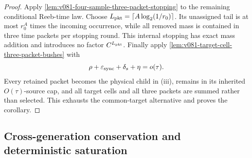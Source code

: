 \documentclass[10pt]{article}
\begin{document}
\begin{proof}
Apply
\cref{lem:v081-four-sample-three-packet-stopping} to the remaining conditional Reeb-time law.
Choose \(L_{\rm pkt}=\lceil A\log_2(1/r_0)\rceil\).  Its unassigned tail is at most
\(r_0^A\) times the incoming occurrence, while all removed mass is contained in three time packets
per stopping round.  This internal stopping has exact mass addition and introduces no factor
\(C^{L_{\rm pkt}}\).  Finally apply
\cref{lem:v081-target-cell-three-packet-bushes} with
\[
\rho+\varepsilon_{\rm sync}+\delta_s+\eta=o(\tau).
\]
Every retained packet becomes the physical child in \textnormal{(iii)}, remains in its inherited
\(O(\tau)\)-source cap, and all target cells and all three packets are summed rather than selected.
This exhausts the common-target alternative and proves the corollary.
\end{proof}

\subsection{Cross-generation conservation and deterministic saturation}
\end{document}
